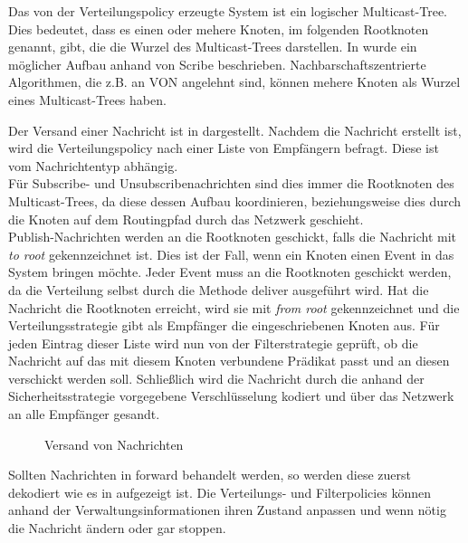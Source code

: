 Das von der Verteilungspolicy erzeugte System ist ein logischer Multicast-Tree. Dies bedeutet, dass es einen oder mehere Knoten, im folgenden Rootknoten genannt, gibt, die die Wurzel des Multicast-Trees darstellen. In  wurde ein möglicher Aufbau anhand von Scribe beschrieben. Nachbarschaftszentrierte Algorithmen, die z.B. an VON \cite{Hu2006VON} angelehnt sind, können mehere Knoten als Wurzel eines Multicast-Trees haben. 

Der Versand einer Nachricht ist in  dargestellt. Nachdem die Nachricht erstellt ist, wird die Verteilungspolicy nach einer Liste von Empfängern befragt. Diese ist vom Nachrichtentyp abhängig.\\
Für Subscribe- und Unsubscribenachrichten sind dies immer die Rootknoten des Multicast-Trees, da diese dessen Aufbau koordinieren, beziehungsweise dies durch die Knoten auf dem Routingpfad durch das Netzwerk geschieht.\\
Publish-Nachrichten werden an die Rootknoten geschickt, falls die Nachricht mit \emph{to root} gekennzeichnet ist. Dies ist der Fall, wenn ein Knoten einen Event in das System bringen möchte. Jeder Event muss an die Rootknoten geschickt werden, da die Verteilung selbst durch die Methode deliver ausgeführt wird. Hat die Nachricht die Rootknoten erreicht, wird sie mit \emph{from root} gekennzeichnet und die Verteilungsstrategie gibt als Empfänger die eingeschriebenen Knoten aus. Für jeden Eintrag dieser Liste wird nun von der Filterstrategie geprüft, ob die Nachricht auf das mit diesem Knoten verbundene Prädikat passt und an diesen verschickt werden soll. Schließlich wird die Nachricht durch die anhand der Sicherheitsstrategie vorgegebene Verschlüsselung kodiert und über das Netzwerk an alle Empfänger gesandt.

\begin{figure}[htbp]
\centering
{}
\caption{Versand von Nachrichten}
\label{fig:processing_send}
\end{figure}

Sollten Nachrichten in forward behandelt werden, so werden diese zuerst dekodiert wie es in  aufgezeigt ist. Die Verteilungs- und Filterpolicies können anhand der Verwaltungsinformationen ihren Zustand anpassen und wenn nötig die Nachricht ändern oder gar stoppen.

